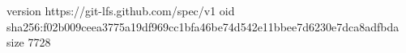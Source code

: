 version https://git-lfs.github.com/spec/v1
oid sha256:f02b009ceea3775a19df969cc1bfa46be74d542e11bbee7d6230e7dca8adfbda
size 7728
